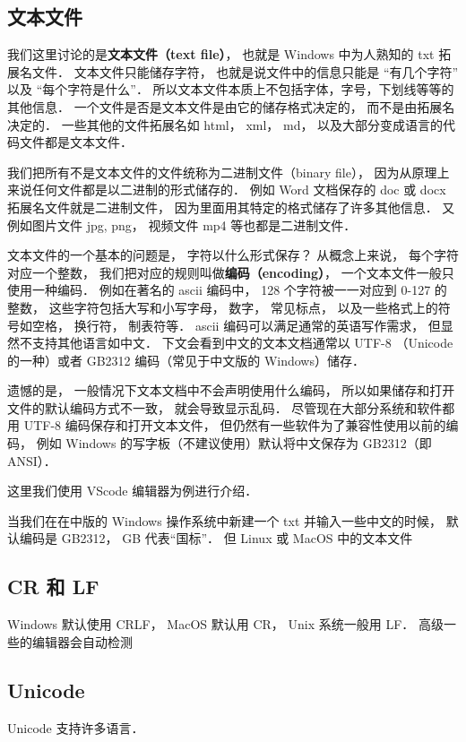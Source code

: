 
\subsection{文本文件}
我们这里讨论的是\textbf{文本文件（text file）}， 也就是 Windows 中为人熟知的 txt 拓展名文件． 文本文件只能储存字符， 也就是说文件中的信息只能是 “有几个字符” 以及 “每个字符是什么”． 所以文本文件本质上不包括字体，字号，下划线等等的其他信息． 一个文件是否是文本文件是由它的储存格式决定的， 而不是由拓展名决定的． 一些其他的文件拓展名如 html， xml， md， 以及大部分变成语言的代码文件都是文本文件．

我们把所有不是文本文件的文件统称为二进制文件（binary file）， 因为从原理上来说任何文件都是以二进制的形式储存的． 例如 Word 文档保存的 doc 或 docx 拓展名文件就是二进制文件， 因为里面用其特定的格式储存了许多其他信息．  又例如图片文件 jpg, png， 视频文件 mp4 等也都是二进制文件．

文本文件的一个基本的问题是， 字符以什么形式保存？ 从概念上来说， 每个字符对应一个整数， 我们把对应的规则叫做\textbf{编码（encoding）}， 一个文本文件一般只使用一种编码． 例如在著名的 ascii 编码中， 128 个字符被一一对应到 0-127 的整数， 这些字符包括大写和小写字母， 数字， 常见标点， 以及一些格式上的符号如空格， 换行符， 制表符等． ascii 编码可以满足通常的英语写作需求， 但显然不支持其他语言如中文． 下文会看到中文的文本文档通常以 UTF-8 （Unicode 的一种）或者 GB2312 编码（常见于中文版的 Windows）储存．

遗憾的是， 一般情况下文本文档中不会声明使用什么编码， 所以如果储存和打开文件的默认编码方式不一致， 就会导致显示乱码． 尽管现在大部分系统和软件都用 UTF-8 编码保存和打开文本文件， 但仍然有一些软件为了兼容性使用以前的编码， 例如 Windows 的写字板（不建议使用）默认将中文保存为 GB2312（即 ANSI）．

这里我们使用 VScode 编辑器为例进行介绍．

当我们在在中版的 Windows 操作系统中新建一个 txt 并输入一些中文的时候， 默认编码是 GB2312， GB 代表“国标”． 但 Linux 或 MacOS 中的文本文件

\subsection{CR 和 LF}
Windows 默认使用 CRLF， MacOS 默认用 CR， Unix 系统一般用 LF． 高级一些的编辑器会自动检测

\subsection{Unicode}
Unicode 支持许多语言．
